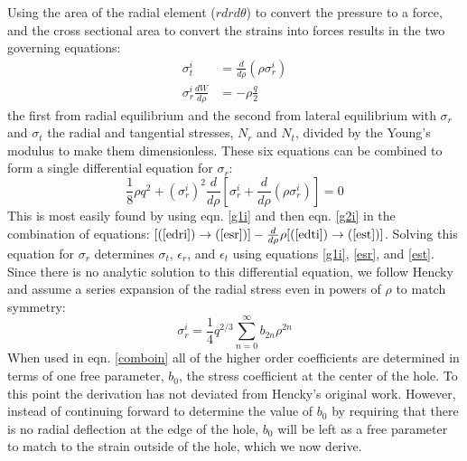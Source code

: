 Using the area of the radial element ($r dr d\theta$) to convert the pressure to a force, and the cross sectional area to convert the strains into forces results in the two governing equations:
\begin{align}
\sigma_t^i&=\frac{d}{d \rho}(\rho \sigma_r^i) \label{g1i}\\
\sigma_r^i \frac{dW}{d \rho}&=-\rho \frac{q}{2} \label{g2i}
\end{align}
the first from radial equilibrium and the second from lateral equilibrium with $\sigma_r$ and $\sigma_t$ the radial and tangential stresses, $N_r$ and $N_t$, divided by the Young's modulus to make them dimensionless.  These six equations can be combined to form a single differential equation for $\sigma_r$:
\begin{equation}
\frac{1}{8} \rho q^2+ (\sigma_r^i)^2 \frac{d}{d\rho}[\sigma_r^i+\frac{d}{d\rho}(\rho \sigma_r^i)]=0
\label{comboin}
\end{equation}
This is most easily found by using eqn. \ref{g1i} and then eqn. \ref{g2i} in the combination of equations: $[(\ref{edri}) \rightarrow (\ref{esr})]-\frac{d}{d \rho}\rho[(\ref{edti})\rightarrow(\ref{est})]$.  Solving this equation for $\sigma_r$ determines $\sigma_t$, $\epsilon_r$, and $\epsilon_t$ using equations \ref{g1i}, \ref{esr}, and \ref{est}.  Since there is no analytic solution to this differential equation, we follow Hencky and assume a series expansion of the radial stress even in powers of $\rho$ to match symmetry:
\begin{equation}
\sigma_r^i=\frac{1}{4} q^{2/3} \sum_{n=0}^{\infty} b_{2n} \rho^{2n}
\end{equation}
When used in eqn. \ref{comboin} all of the higher order coefficients are determined in terms of one free parameter, $b_0$, the stress coefficient at the center of the hole.  To this point the derivation has not deviated from Hencky's original work.  However, instead of continuing forward to determine the value of $b_0$ by requiring that there is no radial deflection at the edge of the hole, $b_0$ will be left as a free parameter to match to the strain outside of the hole, which we now derive.

